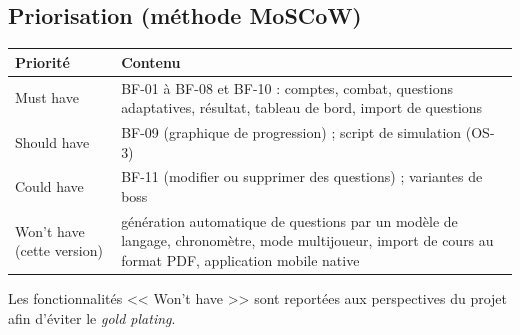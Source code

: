 \documentclass[11pt,a4paper]{article}
\begin{document}
\subsection{Priorisation (m\'ethode MoSCoW)}
\begin{center}
\small
\begin{tabular}{L{2.6cm}L{12.6cm}}
\toprule
\textbf{Priorit\'e} & \textbf{Contenu}\\
\midrule
Must have & BF-01 \`a BF-08 et BF-10 : comptes, combat, questions adaptatives, r\'esultat, tableau de bord, import de questions\\
Should have & BF-09 (graphique de progression) ; script de simulation (OS-3)\\
Could have & BF-11 (modifier ou supprimer des questions) ; variantes de boss\\
Won't have (cette version) & g\'en\'eration automatique de questions par un mod\`ele de langage, chronom\`etre, mode multijoueur, import de cours au format PDF, application mobile native\\
\bottomrule
\end{tabular}
\end{center}
Les fonctionnalit\'es << Won't have >> sont report\'ees aux perspectives du projet afin d'\'eviter le \emph{gold plating}.
\end{document}
